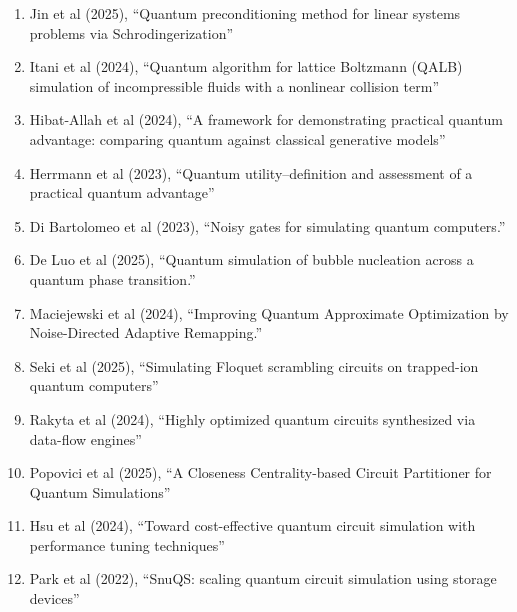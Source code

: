 \documentclass[]{article}
\begin{document}
\begin{enumerate}
\item Jin et al (2025)\cite{jin2025quantum}, ``Quantum preconditioning method for linear systems problems via Schrodingerization''
\item Itani et al (2024)\cite{itani2024quantum}, ``Quantum algorithm for lattice Boltzmann (QALB) simulation of incompressible fluids with a nonlinear collision term''
\item Hibat-Allah et al (2024)\cite{hibat2024framework}, ``A framework for demonstrating practical quantum advantage: comparing quantum against classical generative models''
\item Herrmann et al (2023)\cite{herrmann2023quantum}, ``Quantum utility--definition and assessment of a practical quantum advantage''
\item Di Bartolomeo et al (2023)\cite{di2023noisy}, ``Noisy gates for simulating quantum computers.''
\item De Luo et al (2025)\cite{luo2025quantumsimulationbubblenucleation}, ``Quantum simulation of bubble nucleation across a quantum phase transition.''
\item Maciejewski et al (2024)\cite{maciejewski2024improvingquantumapproximateoptimization}, ``Improving Quantum Approximate Optimization by Noise-Directed Adaptive Remapping.''
\item Seki et al (2025)\cite{PhysRevResearch.7.023032}, ``Simulating Floquet scrambling circuits on trapped-ion quantum computers''
\item Rakyta et al (2024)\cite{rakyta2024highly}, ``Highly optimized quantum circuits synthesized via data-flow engines''
\item Popovici et al (2025)\cite{popovici2025closenesscentralitybasedcircuitpartitioner}, ``A Closeness Centrality-based Circuit Partitioner for Quantum Simulations''
\item Hsu et al (2024)\cite{Hsu31122024}, ``Toward cost-effective quantum circuit simulation with performance tuning techniques''
\item Park et al (2022)\cite{10.1145/3524059.3532375}, ``SnuQS: scaling quantum circuit simulation using storage devices''
\end{enumerate}

\end{document}
